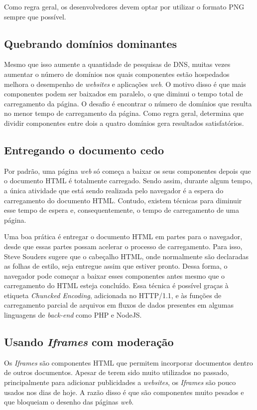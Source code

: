 Como regra geral, os desenvolvedores devem optar por utilizar o formato PNG sempre que possível.

\subsection{Quebrando domínios dominantes}
\label{subsec:evenfaster_cap11}
Mesmo que isso aumente a quantidade de pesquisas de DNS, muitas vezes aumentar o número de domínios nos quais componentes estão hospedados melhora o desempenho de \textit{websites} e aplicações \textit{web}. O motivo disso é que mais componentes podem ser baixados em paralelo, o que diminui o tempo total de carregamento da página. O desafio é encontrar o número de domínios que resulta no menor tempo de carregamento da página. Como regra geral,  determina que dividir componentes entre dois a quatro domínios gera resultados satisfatórios.

\subsection{Entregando o documento cedo}
\label{subsec:evenfaster_cap12}
Por padrão, uma página \textit{web} só começa a baixar os seus componentes depois que o documento HTML é totalmente carregado. Sendo assim, durante algum tempo, a única atividade que está sendo realizada pelo navegador é a espera do carregamento do documento HTML. Contudo, existem técnicas para diminuir esse tempo de espera e, consequentemente, o tempo de carregamento de uma página.

Uma boa prática é entregar o documento HTML em partes para o navegador, desde que essas partes possam acelerar o processo de carregamento. Para isso, Steve Souders sugere que o cabeçalho HTML, onde normalmente são declaradas as folhas de estilo, seja entregue assim que estiver pronto. Dessa forma, o navegador pode começar a baixar esses componentes antes mesmo que o carregamento do HTML esteja concluído. Essa técnica é possível graças à etiqueta \textit{Chuncked Encoding}, adicionada no HTTP/1.1, e às funções de carregamento parcial de arquivos em fluxos de dados presentes em algumas linguagens de \textit{back-end} como PHP e NodeJS.

\subsection{Usando \textit{Iframes} com moderação}
\label{subsec:evenfaster_cap13}
Os \textit{Iframes} são componentes HTML que permitem incorporar documentos dentro de outros documentos. Apesar de terem sido muito utilizados no passado, principalmente para adicionar publicidades a \textit{websites}, os \textit{Iframes} são pouco usados nos dias de hoje. A razão disso é que são componentes muito pesados e que bloqueiam o desenho das páginas \textit{web}.


